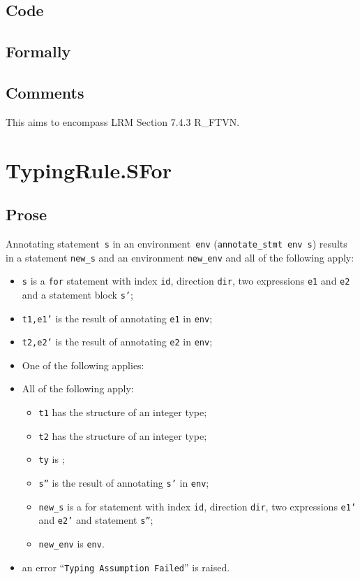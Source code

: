\documentclass{book}
\begin{document}
  \subsection{Code}

  \subsection{Formally}

  \subsection{Comments}
    This aims to encompass LRM Section 7.4.3 R\_FTVN.

\section{TypingRule.SFor \label{sec:TypingRule.SFor}}

  \subsection{Prose}
Annotating statement~\texttt{s} in an environment~\texttt{env}
(\texttt{annotate\_stmt env s}) results in a statement \texttt{new\_s} and an
environment \texttt{new\_env} and all of the following apply:
   \begin{itemize}
   \item \texttt{s} is a \texttt{for} statement with index \texttt{id}, direction \texttt{dir}, two expressions
      \texttt{e1} and \texttt{e2} and a statement block \texttt{s'};
   \item \texttt{t1,e1'} is the result of annotating \texttt{e1} in \texttt{env};
   \item \texttt{t2,e2'} is the result of annotating \texttt{e2} in \texttt{env};
   \item One of the following applies:
     \item All of the following apply:
       \begin{itemize}
       \item \texttt{t1} has the structure of an integer type;
       \item \texttt{t2} has the structure of an integer type;
       \item \texttt{ty} is ;
       \item \texttt{s''} is the result of annotating \texttt{s'} in \texttt{env};
       \item \texttt{new\_s} is a for statement with index \texttt{id}, direction \texttt{dir}, two expressions \texttt{e1'} and \texttt{e2'} and statement \texttt{s''};
       \item \texttt{new\_env} is \texttt{env}.
       \end{itemize}
     \item an error ``\texttt{Typing Assumption Failed}'' is raised.
   \end{itemize}
\end{document}
